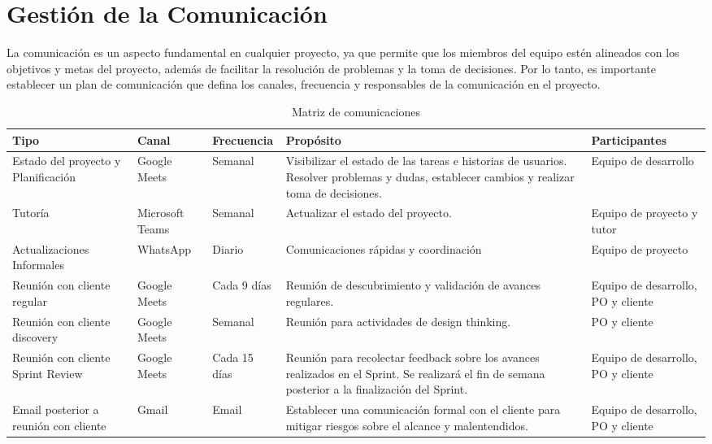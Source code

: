 \section{Gestión de la Comunicación}\label{sec:gestionDeComunicacion}

La comunicación es un aspecto fundamental en cualquier proyecto, ya que permite que los miembros del equipo estén alineados con los objetivos y metas del proyecto,
además de facilitar la resolución de problemas y la toma de decisiones. Por lo tanto, es importante establecer un plan de comunicación que defina los canales,
frecuencia y responsables de la comunicación en el proyecto.

\begin{landscape}
    \begin{table}[H]
        \centering
        \scriptsize
        \begin{tabular}{p{3cm} p{2cm} p{2cm} p{8cm} p{4cm}}
        \hline
        \textbf{Tipo} & \textbf{Canal} & \textbf{Frecuencia} & \textbf{Propósito} & \textbf{Participantes} \\ \hline
        Estado del proyecto y Planificación & Google Meets & Semanal & Visibilizar el estado de las tareas e historias de usuarios. Resolver problemas y dudas, establecer cambios y realizar toma de decisiones. & Equipo de desarrollo \\ \hline
        Tutoría & Microsoft Teams & Semanal & Actualizar el estado del proyecto. & Equipo de proyecto y tutor \\ \hline
        Actualizaciones Informales & WhatsApp & Diario & Comunicaciones rápidas y coordinación & Equipo de proyecto \\ \hline
        Reunión con cliente regular & Google Meets & Cada 9 días & Reunión de descubrimiento y validación de avances regulares. & Equipo de desarrollo, PO y cliente \\ \hline
        Reunión con cliente discovery & Google Meets & Semanal & Reunión para actividades de design thinking. & PO y cliente \\ \hline
        Reunión con cliente Sprint Review & Google Meets & Cada 15 días & Reunión para recolectar feedback sobre los avances realizados en el Sprint. Se realizará el fin de semana posterior a la finalización del Sprint. & Equipo de desarrollo, PO y cliente \\ \hline
        Email posterior a reunión con cliente & Gmail & Email & Establecer una comunicación formal con el cliente para mitigar riesgos sobre el alcance y malentendidos. & Equipo de desarrollo, PO y cliente \\ \hline
        \end{tabular}
        \caption{Matriz de comunicaciones}
        \label{tab:matriDeComunicaciones}
    \end{table}
    
\end{landscape}


